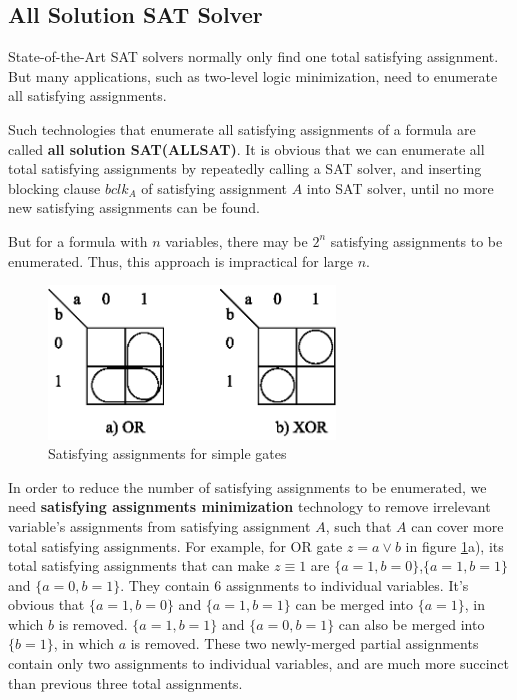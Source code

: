 \documentclass[journal]{IEEEtran}
\begin{document}
%
%


\subsection{All Solution SAT Solver}\label{subsec_ALLSAT}

State-of-the-Art SAT solvers normally only find one total satisfying assignment.
But many applications,
such as two-level logic minimization\cite{SATLOGICMIN},
need to enumerate all satisfying assignments.

Such technologies that enumerate all satisfying assignments of a formula are called \textbf{all solution SAT(ALLSAT)}.
It is obvious that we can enumerate all total satisfying assignments by repeatedly calling a SAT solver,
and inserting blocking clause $bclk_A$ of satisfying assignment $A$ into SAT solver,
until no more new satisfying assignments can be found.

But for a formula with $n$ variables,
there may be $2^n$ satisfying assignments to be enumerated.
Thus, this approach is impractical for large $n$.

\begin{figure}[!t]
\centering
\includegraphics[width=3in]{minterm}
\caption{Satisfying assignments for simple gates}
\label{ORXOR}
\end{figure}

In order to reduce the number of satisfying assignments to be enumerated,
we need \textbf{satisfying assignments minimization} technology to remove irrelevant variable's assignments from satisfying assignment $A$,
such that $A$ can cover more total satisfying assignments.
For example, for OR gate $z= a\vee b$ in figure \ref{ORXOR}a),
its total satisfying assignments that can make $z\equiv 1$ are $\{a= 1, b= 0\}$,$\{a= 1, b= 1\}$ and $\{a= 0, b= 1\}$.
They contain 6 assignments to individual variables.
It's obvious that $\{a= 1, b= 0\}$ and $\{a= 1, b= 1\}$ can be merged into $\{a= 1\}$, in which $b$ is removed.
$\{a= 1, b= 1\}$ and $\{a= 0, b= 1\}$ can also be merged into $\{b= 1\}$, in which $a$ is removed.
These two newly-merged partial assignments contain only two assignments to individual variables,
and are much more succinct than previous three total assignments.
\end{document}
